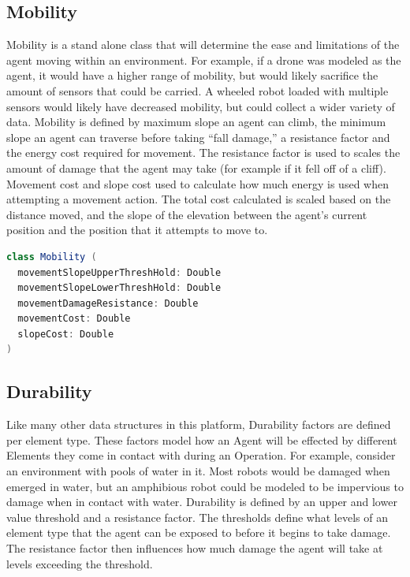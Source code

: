 \subsection{Mobility} \label{subsec:mobility}
Mobility is a stand alone class that will determine the ease and limitations of the agent moving within an environment.
For example, if a drone was modeled as the agent, it would have a higher range of mobility, but would likely sacrifice the amount of sensors that could be carried.
A wheeled robot loaded with multiple sensors would likely have decreased mobility, but could collect a wider variety of data.
Mobility is defined by maximum slope an agent can climb, the minimum slope an agent can traverse before taking ``fall damage,'' a resistance factor and the energy cost required for movement.
The resistance factor is used to scales the amount of damage that the agent may take (for example if it fell off of a cliff).
Movement cost and slope cost used to calculate how much energy is used when attempting a movement action.
The total cost calculated is scaled based on the distance moved, and the slope of the elevation between the agent's current position and the position that it attempts to move to.


\begin{lstlisting}[language=Scala]
class Mobility (
  movementSlopeUpperThreshHold: Double
  movementSlopeLowerThreshHold: Double
  movementDamageResistance: Double
  movementCost: Double
  slopeCost: Double
)
\end{lstlisting}

\subsection{Durability} \label{subsec:durability}
Like many other data structures in this platform, Durability factors are defined per element type.
These factors model how an Agent will be effected by different Elements they come in contact with during an Operation.
For example, consider an environment with pools of water in it.
Most robots would be damaged when emerged in water, but an amphibious robot could be modeled to be impervious to damage when in contact with water.
Durability is defined by an upper and lower value threshold and a resistance factor.
The thresholds define what levels of an element type that the agent can be exposed to before it begins to take damage.
The resistance factor then influences how much damage the agent will take at levels exceeding the threshold.

